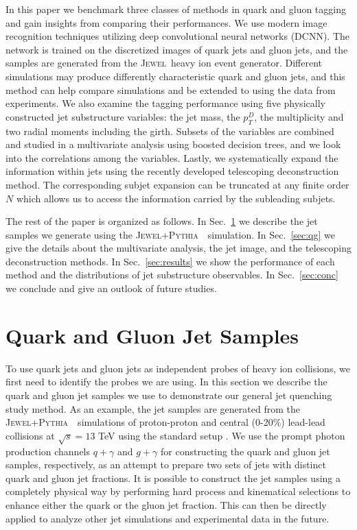 \documentclass[notoc]{JHEP3}
\newcommand{\jw}{\textsc{Jewel}~}
\newcommand{\jwpy}{\textsc{Jewel+Pythia}~}
\begin{document}
In this paper we benchmark three classes of methods in quark and gluon tagging and gain insights from comparing their performances. We use modern image recognition techniques utilizing deep convolutional neural networks (DCNN). The network is trained on the discretized images of quark jets and gluon jets, and the samples are generated from the \jw heavy ion event generator. Different simulations may produce differently characteristic quark and gluon jets, and this method can help compare simulations and be extended to using the data from experiments. We also examine the tagging performance using five physically constructed jet substructure variables: the jet mass, the $p_T^D$, the multiplicity and two radial moments including the girth. Subsets of the variables are combined and studied in a multivariate analysis using boosted decision trees, and we look into the correlations among the variables. Lastly, we systematically expand the information within jets using the recently developed telescoping deconstruction method. The corresponding subjet expansion can be truncated at any finite order $N$ which allows us to access the information carried by the subleading subjets.

The rest of the paper is organized as follows. In Sec.~\ref{sec:sample} we describe the jet samples we generate using the \jwpy ~simulation. In Sec.~\ref{sec:qg} we give the details about the multivariate analysis, the jet image, and the telescoping deconstruction methods. In Sec.~\ref{sec:results} we show the performance of each method and the distributions of jet substructure observables. In Sec.~\ref{sec:conc} we conclude and give an outlook of future studies.




\section{Quark and Gluon Jet Samples}
\label{sec:sample}

To use quark jets and gluon jets as independent probes of heavy ion collisions, we first need to identify the probes we are using. In this section we describe the quark and gluon jet samples we use to demonstrate our general jet quenching study method. As an example, the jet samples are generated from the \jwpy ~simulations of proton-proton and central (0-20\%) lead-lead collisions at $\sqrt{s}=13$ TeV using the standard setup \cite{Zapp:2013zya}. We use the prompt photon production channels \cite{KunnawalkamElayavalli:2016ttl} $q +\gamma$ and $g +\gamma$ for constructing the quark and gluon jet samples, respectively, as an attempt to prepare two sets of jets with distinct quark and gluon jet fractions. It is possible to construct the jet samples using a completely physical way by performing hard process and kinematical selections to enhance either the quark or the gluon jet fraction. This can then be directly applied to analyze other jet simulations and experimental data in the future.
\end{document}
